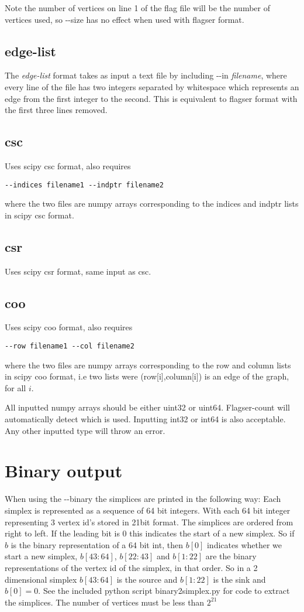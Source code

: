 \documentclass{amsart}
\theoremstyle{definition}
\begin{document}
Note the number of vertices on line 1 of the flag file will be the number of vertices used, so -{}-size has no effect when used with flagser format.

\subsection{edge-list}
The \textit{edge-list} format takes as input a text file by including -{}-in \textit{filename}, where every line of the file has two integers separated by whitespace which represents an edge from the first integer to the second. This is equivalent to flagser format with the first three lines removed.

\subsection{csc}
Uses scipy csc format, also requires
\begin{verbatim}--indices filename1 --indptr filename2\end{verbatim}
where the two files are numpy arrays corresponding to the indices and indptr lists in scipy csc format.

\subsection{csr}
Uses scipy csr format, same input as csc.

\subsection{coo}
Uses scipy coo format, also requires
\begin{verbatim}--row filename1 --col filename2\end{verbatim}
 where the two files are numpy arrays corresponding to the row and column lists in scipy coo format, i.e two lists were (row[i],column[i]) is an edge of the graph, for all $i$.

All inputted numpy arrays should be either uint32 or uint64. Flagser-count will automatically detect which is used. Inputting int32 or int64 is also acceptable. Any other inputted type will throw an error.
\section{Binary output}
When using the -{}-binary the simplices are printed in the following way: Each simplex is represented as a sequence of 64 bit integers. With each 64 bit integer representing 3 vertex id's stored in 21bit format. The simplices are ordered from right to left. If the leading bit is 0 this indicates the start of a new simplex. So if $b$ is the binary representation of a 64 bit int, then $b[0]$ indicates whether we start a new simplex, $b[43:64]$, $b[22:43]$ and $b[1:22]$ are the binary representations of the vertex id of the simplex, in that order. So in a 2 dimensional simplex $b[43:64]$ is the source and $b[1:22]$ is the sink and $b[0]=0$. See the included python script binary2simplex.py for code to extract the simplices. The number of vertices must be less than $2^{21}$
\end{document}
